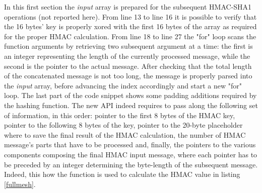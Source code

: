 In this first section the \textit{input} array is prepared for the subsequent HMAC-SHA1 operations (not reported here). From line 13 to line 16 it is possible to verify that the 16 bytes' key is properly xored with the first 16 bytes of the array as required for the proper HMAC calculation. From line 18 to line 27 the "for" loop scans the function arguments by retrieving two subsequent argument at a time: the first is an integer representing the length of the currently processed message, while the second is the pointer to the actual message. After checking that the total length of the concatenated message is not too long, the message is properly parsed into the \textit{input} array, before advancing the index accordingly and start a new "for" loop. The last part of the code snippet shows some padding additions required by the hashing function. The new API indeed requires to pass along the following set of information, in this order: pointer to the first 8 bytes of the HMAC key, pointer to the following 8 bytes of the key, pointer to the 20-byte placeholder where to save the final result of the HMAC calculation, the number of HMAC message's parts that have to be processed and, finally, the pointers to the various components composing the final HMAC input message, where each pointer has to be preceded by an integer determining the byte-length of the subsequent message. Indeed, this how the function is used to calculate the HMAC value in listing \ref{fullmesh}.

